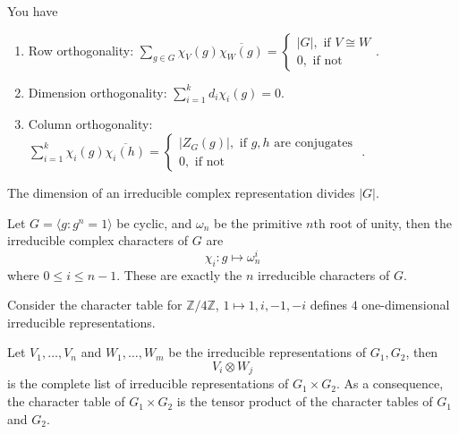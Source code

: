 \documentclass[openany]{book}
\newcommand{\Z}{\mathbb{Z}}
\newcommand{\la}{\langle}
\newcommand{\ra}{\rangle}
\newcommand{\om}{\omega}
\begin{document}
\begin{prop}
You have
    \begin{enumerate}
    \item Row orthogonality: $\sum_{g\in G}\chi_V(g)\overline{\chi_W(g)}=\begin{cases}
        |G|, \text{ if $V\cong W$}\\
        0, \text{ if not}
    \end{cases}$.
    \item Dimension orthogonality: $\sum_{i=1}^kd_i\chi_i(g)=0$.
    \item Column orthogonality: $\sum_{i=1}^k\chi_i(g)\overline{\chi_i(h)}=\begin{cases}
        |Z_G(g)|, \text{ if $g,h$ are conjugates } \\
        0, \text{ if not}
    \end{cases}$.
\end{enumerate}
\end{prop}


\begin{prop}
    The dimension of an irreducible complex representation divides $|G|$.
\end{prop}


\begin{prop}
    Let $G=\la g: g^n=1\ra$ be cyclic, and $\om_n$ be the primitive $n$th root of unity, then the irreducible complex characters of $G$ are 
    \begin{equation*}
        \chi_i: g\mapsto \om_n^i
    \end{equation*}
    where $0\leq i\leq n-1$. These are exactly the $n$ irreducible characters of $G$.
\end{prop}
\begin{example}
    Consider the character table for $\Z/4\Z$, $1\mapsto 1, i, -1, -i$ defines $4$ one-dimensional irreducible representations.
\end{example}

\begin{prop}
    Let $V_1,\dots, V_n$ and $W_1,\dots, W_m$ be the irreducible representations of $G_1,G_2$, then 
    \begin{equation*}
        V_i\otimes W_j
    \end{equation*}
    is the complete list of irreducible representations of $G_1\times G_2$. As a consequence, the character table of $G_1\times G_2$ is the tensor product of the character tables of $G_1$ and $G_2$.
\end{prop}
\end{document}
